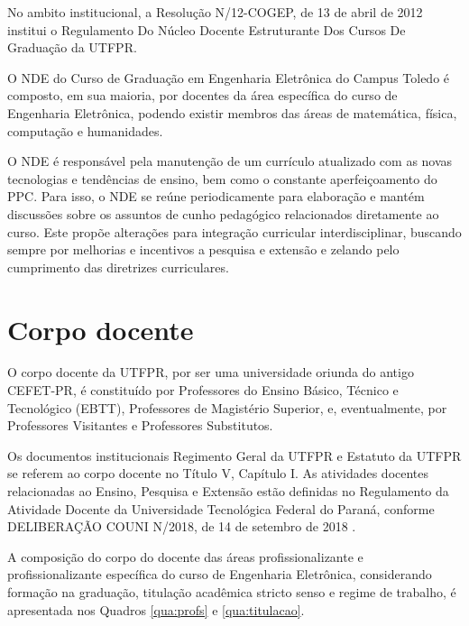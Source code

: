  No ambito institucional, a Resolução N/12-COGEP, de 13 de abril de 2012 \cite{cogep9} institui o Regulamento Do Núcleo Docente Estruturante Dos Cursos De Graduação da UTFPR.

O NDE do Curso de Graduação em Engenharia Eletrônica do Campus Toledo é composto, em sua maioria, por docentes da área específica do curso de Engenharia Eletrônica, podendo existir membros das áreas de matemática, física, computação e humanidades. 

O NDE é responsável pela manutenção de um currículo atualizado com as novas tecnologias e tendências de ensino, bem como o constante aperfeiçoamento do PPC. Para isso, o NDE se reúne periodicamente para elaboração e mantém discussões sobre os assuntos de cunho pedagógico relacionados diretamente ao curso. Este propõe alterações para integração curricular interdisciplinar, buscando sempre por melhorias e incentivos a pesquisa e extensão e zelando pelo cumprimento das diretrizes curriculares.


\section{Corpo docente}

O corpo docente da UTFPR, por ser uma universidade oriunda do antigo CEFET-PR, é constituído por Professores do Ensino Básico, Técnico e Tecnológico (EBTT), Professores de Magistério Superior, e, eventualmente, por Professores Visitantes e Professores Substitutos.

Os documentos institucionais Regimento Geral da UTFPR e Estatuto da UTFPR \cite{estatutoutfpr} se referem ao corpo docente no Título V, Capítulo I. As atividades docentes relacionadas ao Ensino, Pesquisa e Extensão estão definidas no Regulamento da Atividade Docente da Universidade Tecnológica Federal do Paraná, conforme DELIBERAÇÃO COUNI N/2018, de 14 de setembro de 2018 \cite{couni25}. 

A composição do corpo do docente das áreas profissionalizante e profissionalizante específica do curso de Engenharia Eletrônica, considerando formação na graduação, titulação acadêmica stricto senso e regime de trabalho, é apresentada nos Quadros \ref{qua:profs} e \ref{qua:titulacao}.

